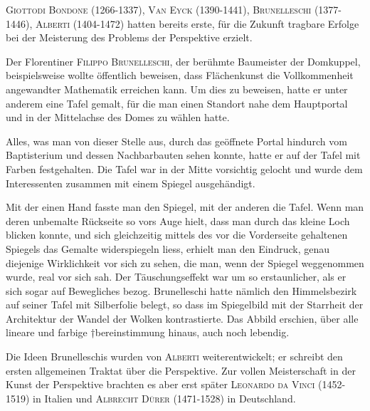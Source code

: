 \documentclass[%
11pt,%
twoside,%
titlepage,%
german,%
headsepline%
]{scrartcl}
\begin{document}
\textsc{Giottodi Bondone} (1266-1337), \textsc{Van Eyck} (1390-1441), \textsc{Brunelleschi} (1377-1446), \textsc{Alberti} (1404-1472) hatten bereits erste, f\"ur die Zukunft tragbare Erfolge bei der Meisterung des Problems der Perspektive erzielt.

Der Florentiner \textsc{Filippo Brunelleschi}, der ber\"uhmte Baumeister der Domkuppel, beispielsweise wollte \"offentlich beweisen, dass Fl\"achenkunst die Vollkommenheit angewandter Mathematik erreichen kann. Um dies zu beweisen, hatte er unter anderem eine Tafel gemalt, f\"ur die man einen Standort nahe dem Hauptportal und in der Mittelachse des Domes zu w\"ahlen hatte.

Alles, was man von dieser Stelle aus, durch das ge\"offnete Portal hindurch vom Baptisterium und dessen Nachbarbauten sehen konnte, hatte er auf der Tafel mit Farben festgehalten. Die Tafel war in der Mitte vorsichtig gelocht und wurde dem Interessenten zusammen mit einem Spiegel ausgeh\"andigt.

Mit der einen Hand fasste man den Spiegel, mit der anderen die Tafel. Wenn man deren unbemalte R\"uckseite so vors Auge hielt, dass man durch das kleine Loch blicken konnte, und sich gleichzeitig mittels des vor die Vorderseite gehaltenen Spiegels das Gemalte widerspiegeln liess, erhielt man den Eindruck, genau diejenige Wirklichkeit vor
sich zu sehen, die man, wenn der
Spiegel weggenommen wurde, real vor sich sah. Der T\"auschungseffekt war um so erstaunlicher, als er sich sogar auf Bewegliches bezog. Brunelleschi hatte n\"amlich den Himmelsbezirk auf seiner Tafel mit Silberfolie belegt, so dass im Spiegelbild mit der Starrheit der Architektur der Wandel der Wolken kontrastierte. Das Abbild erschien, \"uber alle lineare und farbige †bereinstimmung hinaus, auch noch lebendig.

Die Ideen Brunelleschis wurden von \textsc{Alberti} weiterentwickelt; er schreibt den ersten allgemeinen Traktat \"uber die Perspektive. Zur vollen Meisterschaft in der Kunst der Perspektive brachten es aber erst sp\"ater \textsc{Leonardo da Vinci} (1452- 1519) in Italien und \textsc{Albrecht D\"urer} (1471-1528) in Deutschland.
\end{document}
